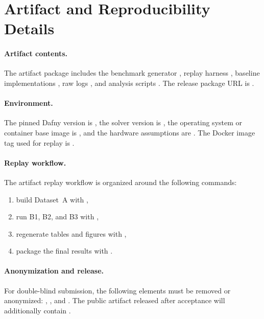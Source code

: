\section{Artifact and Reproducibility Details}
\label{app:artifact}

\paragraph{Artifact contents.}
The artifact package includes the benchmark generator , replay harness , baseline implementations , raw logs , and analysis scripts . The release package URL is .

\paragraph{Environment.}
The pinned Dafny version is , the solver version is , the operating system or container base image is , and the hardware assumptions are . The Docker image tag used for replay is .

\paragraph{Replay workflow.}
The artifact replay workflow is organized around the following commands:
\begin{enumerate}
  \item build Dataset~A with \texttt{},
  \item run B1, B2, and B3 with \texttt{},
  \item regenerate tables and figures with \texttt{},
  \item package the final results with \texttt{}.
\end{enumerate}

\paragraph{Anonymization and release.}
For double-blind submission, the following elements must be removed or anonymized: , , and . The public artifact released after acceptance will additionally contain .
